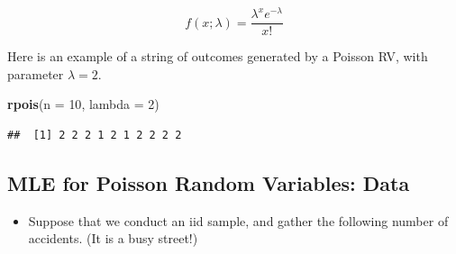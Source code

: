 \documentclass[
]{book}
\newenvironment{Shaded}{\begin{snugshade}}{\end{snugshade}}
\newcommand{\AttributeTok}[1]{\textcolor[rgb]{0.13,0.29,0.53}{#1}}
\newcommand{\DecValTok}[1]{\textcolor[rgb]{0.00,0.00,0.81}{#1}}
\newcommand{\FunctionTok}[1]{\textcolor[rgb]{0.13,0.29,0.53}{\textbf{#1}}}
\newcommand{\NormalTok}[1]{#1}
\providecommand{\tightlist}{%
  \setlength{\itemsep}{0pt}\setlength{\parskip}{0pt}}
\theoremstyle{definition}
\theoremstyle{definition}
\theoremstyle{definition}
\theoremstyle{definition}
\theoremstyle{remark}
\begin{document}
\[
f(x;\lambda) = \frac{\lambda^x e^{-\lambda}}{x!}
\]

Here is an example of a string of outcomes generated by a Poisson RV, with parameter \(\lambda = 2\).

\begin{Shaded}
\begin{Highlighting}[]
\FunctionTok{rpois}\NormalTok{(}\AttributeTok{n =} \DecValTok{10}\NormalTok{, }\AttributeTok{lambda =} \DecValTok{2}\NormalTok{)}
\end{Highlighting}
\end{Shaded}

\begin{verbatim}
##  [1] 2 2 2 1 2 1 2 2 2 2
\end{verbatim}

\subsection{MLE for Poisson Random Variables: Data}\label{mle-for-poisson-random-variables-data}

\begin{itemize}
\tightlist
\item
  Suppose that we conduct an iid sample, and gather the following number of accidents. (It is a busy street!)
\end{itemize}
\end{document}
